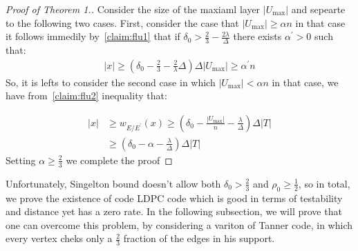   \begin{proof}[Proof of Theorem 1.] Consider the size of the maxiaml layer $|U_{\max}|$ and sepearte to the following two cases. First, consider the case that $|U_{\max}| \ge  \alpha n $ in that case it follows immedily by~\cref{claim:flu1} that if $\delta_{0} > \frac{2}{3} - \frac{2\lambda}{\Delta}$ there exists $\alpha^{\prime} > 0 $ such that:  
  \begin{equation*}
    \begin{split}
      |x| \ge \left( \delta_{0} - \frac{2}{3} - \frac{2}{\lambda}\Delta \right)\Delta|U_{\max}| \ge  \alpha^{\prime} n 
    \end{split}
  \end{equation*}
  So, it is lefts to consider the second case in which $ |U_{\max}| < \alpha n $ in that case, we have from~\cref{claim:flu2} inequality that: 

  \begin{equation*}
    \begin{split}
      |x| & \ge  w_{E/E^{\prime}}\left( x \right)  \ge \left( \delta_{0} - \frac{|U_{\max}|}{n} - \frac{\lambda}{\Delta} \right) \Delta|T| \\ 
      & \ge \left( \delta_{0} - \alpha - \frac{\lambda}{\Delta} \right) \Delta|T| 
    \end{split}
  \end{equation*}
  Setting $\alpha \ge \frac{2}{3}$ we complete the proof
\end{proof}

Unfortunately, Singelton bound doesn't allow both $\delta_0 > \frac{2}{3}$ and $\rho_0 \ge \frac{1}{2}$, so in total, we prove the existence of code LDPC code which is good in terms of testability and distance yet has a zero rate. In the following subsection, we will prove that one can overcome this problem, by considering a variton of Tanner code, in which every vertex cheks only a $\frac{2}{3}$ fraction of the edges in his support.      

